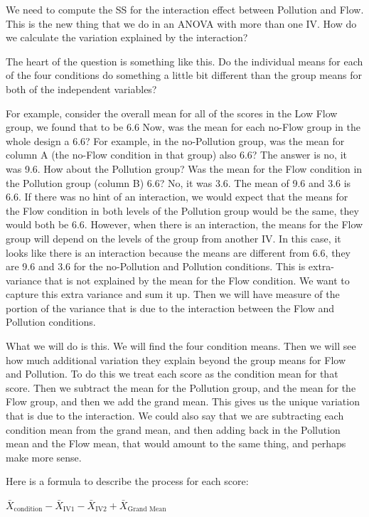 \documentclass[
  letterpaper,
  DIV=11,
  numbers=noendperiod]{scrreprt}
\begin{document}
We need to compute the SS for the interaction effect between Pollution
and Flow. This is the new thing that we do in an ANOVA with more than
one IV. How do we calculate the variation explained by the interaction?

The heart of the question is something like this. Do the individual
means for each of the four conditions do something a little bit
different than the group means for both of the independent variables?

For example, consider the overall mean for all of the scores in the Low
Flow group, we found that to be 6.6 Now, was the mean for each no-Flow
group in the whole design a 6.6? For example, in the no-Pollution group,
was the mean for column A (the no-Flow condition in that group) also
6.6? The answer is no, it was 9.6. How about the Pollution group? Was
the mean for the Flow condition in the Pollution group (column B) 6.6?
No, it was 3.6. The mean of 9.6 and 3.6 is 6.6. If there was no hint of
an interaction, we would expect that the means for the Flow condition in
both levels of the Pollution group would be the same, they would both be
6.6. However, when there is an interaction, the means for the Flow group
will depend on the levels of the group from another IV. In this case, it
looks like there is an interaction because the means are different from
6.6, they are 9.6 and 3.6 for the no-Pollution and Pollution conditions.
This is extra-variance that is not explained by the mean for the Flow
condition. We want to capture this extra variance and sum it up. Then we
will have measure of the portion of the variance that is due to the
interaction between the Flow and Pollution conditions.

What we will do is this. We will find the four condition means. Then we
will see how much additional variation they explain beyond the group
means for Flow and Pollution. To do this we treat each score as the
condition mean for that score. Then we subtract the mean for the
Pollution group, and the mean for the Flow group, and then we add the
grand mean. This gives us the unique variation that is due to the
interaction. We could also say that we are subtracting each condition
mean from the grand mean, and then adding back in the Pollution mean and
the Flow mean, that would amount to the same thing, and perhaps make
more sense.

Here is a formula to describe the process for each score:

\(\bar{X}_\text{condition} -\bar{X}_\text{IV1} - \bar{X}_\text{IV2} + \bar{X}_\text{Grand Mean}\)
\end{document}
